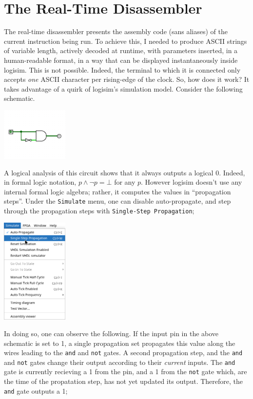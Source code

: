 \documentclass{article}
\def\gate#1{\uppercase{\Verb|#1|}}
\begin{document}
\section{The Real-Time Disassembler}

The real-time disassembler presents the assembly code (sans aliases) of the current instruction being run. To achieve this, I needed to produce ASCII strings of variable length, actively decoded at runtime, with parameters inserted, in a human-readable format, in a way that can be displayed instantaneously inside logisim. This is not possible. Indeed, the terminal to which it is connected only accepts \textit{one} ASCII character per rising-edge of the clock. So, how does it work? It takes advantage of a quirk of logisim's simulation model. Consider the following schematic.

	\begin{center}\includegraphics[width=0.25\textwidth]{images/and_not.png}\end{center}

A logical analysis of this circuit shows that it always outputs a logical 0. Indeed, in formal logic notation, $p \land \neg p = \bot$ for any $p$. However logisim doesn't use any internal formal logic algebra; rather, it computes the values in ``propagation steps''. Under the \Verb|Simulate| menu, one can disable auto-propagate, and step through the propagation steps with \Verb|Single-Step Propagation|;

	\begin{center}\includegraphics[width=0.25\textwidth]{images/single_step.png}\end{center}

In doing so, one can observe the following. If the input pin in the above schematic is set to 1, a single propagation set propagates this value along the wires leading to the \gate{and} and \gate{not} gates. A second propagation step, and the \gate{and} and \gate{not} gates change their output according to their \textit{current} inputs. The \gate{and} gate is currently recieving a 1 from the pin, and a 1 from the \gate{not} gate which, are the time of the propatation step, has not yet updated its output. Therefore, the \gate{and} gate outputs a 1;
\end{document}
